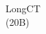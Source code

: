 \documentclass[preview]{standalone}
\begin{document}
\begin{center}
LongCT\\(20B)
\end{center}
\end{document}
